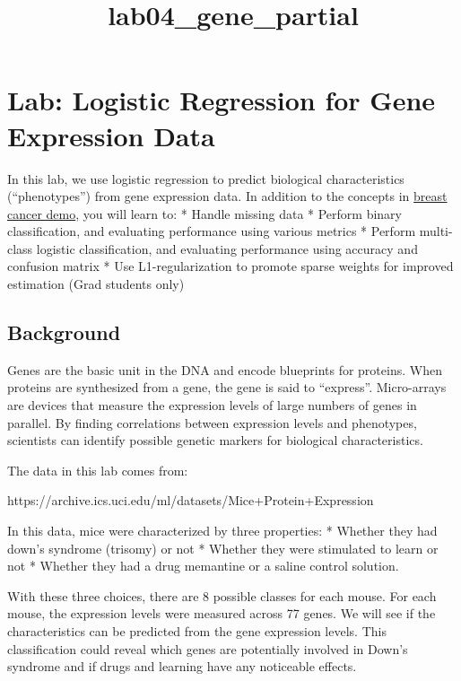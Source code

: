 \documentclass[11pt]{article}
\title{lab04\_gene\_partial}
\begin{document}
    
    
    \maketitle
    
    

    
    \hypertarget{lab-logistic-regression-for-gene-expression-data}{%
\section{Lab: Logistic Regression for Gene Expression
Data}\label{lab-logistic-regression-for-gene-expression-data}}

In this lab, we use logistic regression to predict biological
characteristics (``phenotypes'') from gene expression data. In addition
to the concepts in \href{./demo04_breast_cancer.ipynb}{breast cancer
demo}, you will learn to: * Handle missing data * Perform binary
classification, and evaluating performance using various metrics *
Perform multi-class logistic classification, and evaluating performance
using accuracy and confusion matrix * Use L1-regularization to promote
sparse weights for improved estimation (Grad students only)

\hypertarget{background}{%
\subsection{Background}\label{background}}

Genes are the basic unit in the DNA and encode blueprints for proteins.
When proteins are synthesized from a gene, the gene is said to
``express''. Micro-arrays are devices that measure the expression levels
of large numbers of genes in parallel. By finding correlations between
expression levels and phenotypes, scientists can identify possible
genetic markers for biological characteristics.

The data in this lab comes from:

https://archive.ics.uci.edu/ml/datasets/Mice+Protein+Expression

In this data, mice were characterized by three properties: * Whether
they had down's syndrome (trisomy) or not * Whether they were stimulated
to learn or not * Whether they had a drug memantine or a saline control
solution.

With these three choices, there are 8 possible classes for each mouse.
For each mouse, the expression levels were measured across 77 genes. We
will see if the characteristics can be predicted from the gene
expression levels. This classification could reveal which genes are
potentially involved in Down's syndrome and if drugs and learning have
any noticeable effects.
\end{document}
